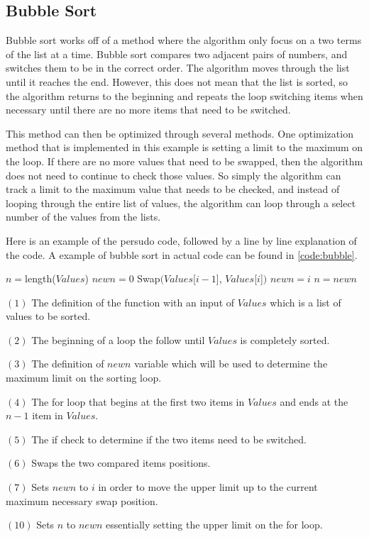 \documentclass{article}
\begin{document}
\subsection{Bubble Sort}
\begin{multicols}{2}
Bubble sort works off of a method where the algorithm only focus on a two terms of the list at a time. Bubble sort compares two adjacent pairs of numbers, and switches them to be in the correct order. The algorithm moves through the list until it reaches the end. However, this does not mean that the list is sorted, so the algorithm returns to the beginning and repeats the loop switching items when necessary until there are no more items that need to be switched.

This method can then be optimized through several methods. One optimization method that is implemented in this example is setting a limit to the maximum on the loop. If there are no more values that need to be swapped, then the algorithm does not need to continue to check those values. So simply the algorithm can track a limit to the maximum value that needs to be checked, and instead of looping through the entire list of values, the algorithm can loop through a select number of the values from the lists.

Here is an example of the persudo code, followed by a line by line explanation of the code. A example of bubble sort in actual code can be found in \ref{code:bubble}.
\end{multicols}
\begin{algorithmic}
\State $n=$length($Values$)
\State $newn=0$
\State Swap$(Values$[$i-1$], $Values$[$i$]$)$
\State $newn=i$
\EndIf
\EndFor
\State $n=newn$
\EndWhile
\EndFunction
\end{algorithmic}
\begin{multicols}{2}
$(1)$ The definition of the function with an input of $Values$ which is a list of values to be sorted.

$(2)$ The beginning of a loop the follow until $Values$ is completely sorted.

$(3)$ The definition of $newn$ variable which will be used to determine the maximum limit on the sorting loop.

$(4)$ The for loop that begins at the first two items in $Values$ and ends at the $n-1$ item in $Values$.

$(5)$ The if check to determine if the two items need to be switched.

$(6)$ Swaps the two compared items positions.

$(7)$ Sets $newn$ to $i$ in order to move the upper limit up to the current maximum necessary swap position.

$(10)$ Sets $n$ to $newn$ essentially setting the upper limit on  the for loop.
\end{multicols}
\end{document}
